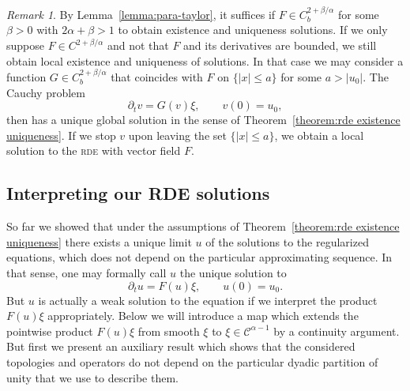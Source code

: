 \documentclass[11pt,a4paper]{article}
\theoremstyle{remark}
\newtheorem{remark}[theorem]{Remark}
\newcommand{\CC}{\ensuremath{\mathscr{C}}}
\begin{document}
\begin{remark}
  By Lemma~\ref{lemma:para-taylor}, it suffices if $F \in C^{2+\beta/\alpha}_b$ for some $\beta >0$ with $2\alpha+\beta>1$ to obtain existence and uniqueness solutions. If we only suppose $F \in C^{2+\beta/\alpha}$ and not that $F$ and its derivatives are
  bounded, we still obtain local existence and uniqueness of solutions. In
  that case we may consider a function $G \in C^{2+\beta/\alpha}_{b}$ that coincides with
  $F$ on $\{ | x | \leqslant a \}$ for some $a> | u_{0} |$. The Cauchy problem
  \[
     \partial_{t} v=G ( v ) \xi , \hspace{2em} v ( 0 ) =u_{0},
  \]
  then has a unique global solution in the sense of Theorem~\ref{theorem:rde
  existence uniqueness}. If we stop $v$ upon leaving the set $\{ | x | \leqslant a \}$, we obtain a local solution to the \textsc{rde} with vector field $F$.
\end{remark}


\subsection{Interpreting our RDE solutions}

  So far we showed that under the assumptions of Theorem~\ref{theorem:rde existence uniqueness} there exists a unique limit $u$ of the solutions to the
  regularized equations, which does not depend on the particular approximating
  sequence. In that sense, one may formally call $u$ the unique solution to
  \[
     \partial_{t} u=F ( u ) \xi , \hspace{2em} u ( 0 ) =u_{0} .
  \]
  But $u$ is actually a weak solution to the equation if we interpret the product $F(u) \xi$ appropriately. Below we will introduce a map which extends the pointwise product $F(u) \xi$ from smooth $\xi$ to $\xi \in \CC^{\alpha-1}$ by a continuity argument. But first we present an auxiliary result which shows that the considered topologies and operators do not depend on the particular dyadic
partition of unity that we use to describe them.
\end{document}
